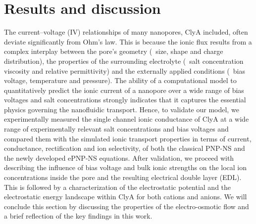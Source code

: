 \documentclass[journal=ancac3,manuscript=article,etalmode=truncate,maxauthors=0,layout=onecolumn]{achemso}
\begin{document}
%
%
%
\section{Results and discussion}\label{sec:results}

The current--voltage (IV) relationships of many nanopores, ClyA included, often deviate significantly from
Ohm's law. This is because the ionic flux results from a complex interplay between the pore's geometry
(\eg~size, shape and charge distribution), the properties of the surrounding electrolyte (\eg~salt
concentration viscosity and relative permittivity) and the externally applied conditions (\eg~bias voltage,
temperature and pressure). The ability of a computational model to quantitatively predict the ionic current of
a nanopore over a wide range of bias voltages and salt concentrations strongly indicates that it captures the
essential physics governing the nanofluidic transport. Hence, to validate our model, we experimentally
measured the single channel ionic conductance of ClyA at a wide range of experimentally relevant salt
concentrations and bias voltages and compared them with the simulated ionic transport properties in terms of
current, conductance, rectification and ion selectivity, of both the classical PNP-NS and the newly developed
ePNP-NS equations. After validation, we proceed with describing the influence of bias voltage and bulk ionic
strengths on the local ion concentrations inside the pore and the resulting electrical double layer (EDL).
This is followed by a characterization of the electrostatic potential and the electrostatic energy landscape
within ClyA for both cations and anions. We will conclude this section by discussing the properties of the
electro-osmotic flow and a brief reflection of the key findings in this work.
\end{document}

